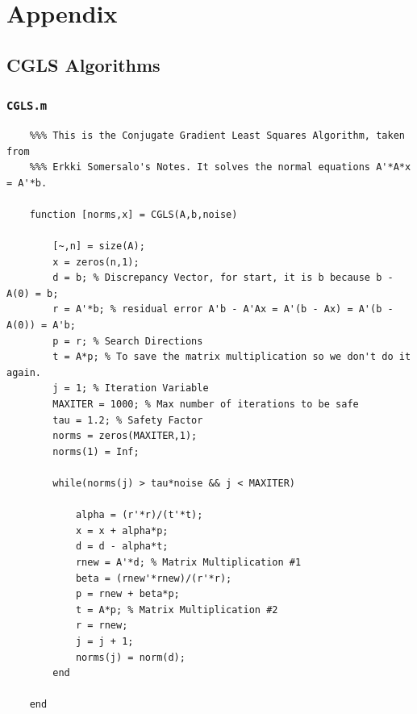 \documentclass{article}
\begin{document}
\section{Appendix}

\subsection{CGLS Algorithms}

\subsubsection{\texttt{CGLS.m}}

\begin{verbatim}
    %%% This is the Conjugate Gradient Least Squares Algorithm, taken from
    %%% Erkki Somersalo's Notes. It solves the normal equations A'*A*x = A'*b.

    function [norms,x] = CGLS(A,b,noise)

        [~,n] = size(A);
        x = zeros(n,1);
        d = b; % Discrepancy Vector, for start, it is b because b - A(0) = b;
        r = A'*b; % residual error A'b - A'Ax = A'(b - Ax) = A'(b - A(0)) = A'b;
        p = r; % Search Directions
        t = A*p; % To save the matrix multiplication so we don't do it again.
        j = 1; % Iteration Variable
        MAXITER = 1000; % Max number of iterations to be safe
        tau = 1.2; % Safety Factor
        norms = zeros(MAXITER,1);
        norms(1) = Inf;

        while(norms(j) > tau*noise && j < MAXITER)

            alpha = (r'*r)/(t'*t);
            x = x + alpha*p;
            d = d - alpha*t;
            rnew = A'*d; % Matrix Multiplication #1
            beta = (rnew'*rnew)/(r'*r);
            p = rnew + beta*p;
            t = A*p; % Matrix Multiplication #2
            r = rnew;
            j = j + 1;
            norms(j) = norm(d);
        end

    end
\end{verbatim}
\end{document}
